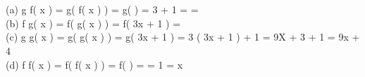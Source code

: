  \\

  \\
(a) \mspace{9mu} g \circ f\left( x \right) = g\left( f\left( x \right) \right) = g\left( \right) = 3 \cdot {} + 1 = =  \\

(b) \mspace{9mu} f \circ g\left( x \right) = f\left( g\left( x \right) \right) = f\left( 3x + 1 \right) =  \\

(c) \mspace{9mu} g \circ g\left( x \right) = g\left( g\left( x \right) \right) = g\left( 3x + 1 \right) = 3 \cdot \left( 3x + 1 \right) + 1 = 9X + 3 + 1 = 9x + 4 \\

(d) \mspace{9mu} f \circ f\left( x \right) = f\left( f\left( x \right) \right) = f\left( \right) =  = 1 \cdot {} = x \\
